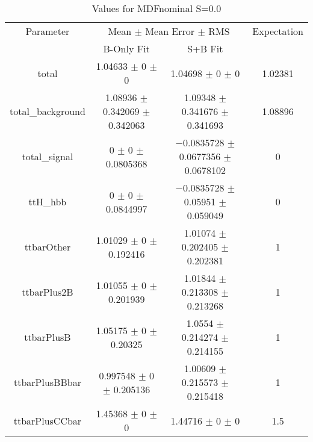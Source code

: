 \begin{table}
\centering
\caption{Values for MDFnominal S=0.0}
\begin{tabular}{cccc}
\toprule
Parameter & \multicolumn{2}{c}{Mean $\pm$ Mean Error $\pm$ RMS} & Expectation\\
 & B-Only Fit & S+B Fit & \\
\midrule
total & \num{1.04633} $\pm$ \num{0} $\pm$ \num{0} & \num{1.04698} $\pm$ \num{0} $\pm$ \num{0} & \num{1.02381}\\
total\_background & \num{1.08936} $\pm$ \num{0.342069} $\pm$ \num{0.342063} & \num{1.09348} $\pm$ \num{0.341676} $\pm$ \num{0.341693} & \num{1.08896}\\
total\_signal & \num{0} $\pm$ \num{0} $\pm$ \num{0.0805368} & \num{-0.0835728} $\pm$ \num{0.0677356} $\pm$ \num{0.0678102} & \num{0}\\
ttH\_hbb & \num{0} $\pm$ \num{0} $\pm$ \num{0.0844997} & \num{-0.0835728} $\pm$ \num{0.05951} $\pm$ \num{0.059049} & \num{0}\\
ttbarOther & \num{1.01029} $\pm$ \num{0} $\pm$ \num{0.192416} & \num{1.01074} $\pm$ \num{0.202405} $\pm$ \num{0.202381} & \num{1}\\
ttbarPlus2B & \num{1.01055} $\pm$ \num{0} $\pm$ \num{0.201939} & \num{1.01844} $\pm$ \num{0.213308} $\pm$ \num{0.213268} & \num{1}\\
ttbarPlusB & \num{1.05175} $\pm$ \num{0} $\pm$ \num{0.20325} & \num{1.0554} $\pm$ \num{0.214274} $\pm$ \num{0.214155} & \num{1}\\
ttbarPlusBBbar & \num{0.997548} $\pm$ \num{0} $\pm$ \num{0.205136} & \num{1.00609} $\pm$ \num{0.215573} $\pm$ \num{0.215418} & \num{1}\\
ttbarPlusCCbar & \num{1.45368} $\pm$ \num{0} $\pm$ \num{0} & \num{1.44716} $\pm$ \num{0} $\pm$ \num{0} & \num{1.5}\\
\bottomrule
\end{tabular}
\end{table}